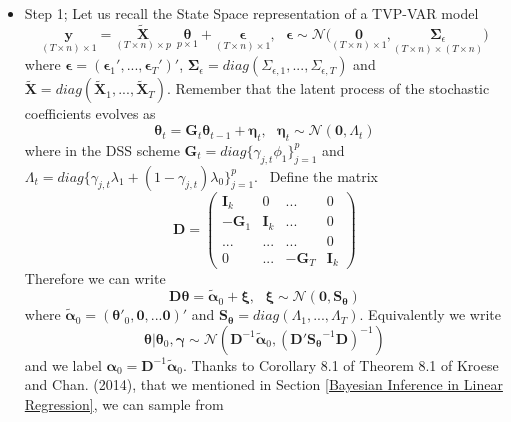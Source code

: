 \documentclass[
  12pt,
]{book}
\theoremstyle{break}
\theoremstyle{nonumberplain}
\begin{document}
\begin{itemize}
\item Step 1; Let us recall the State Space representation of a TVP-VAR model 
\[\underset{(T \times n)\times1}{\boldsymbol{y}}=\underset{(T\times n)\times p}{\tilde{\boldsymbol{X}}}\ \ \underset{p\times 1}{\boldsymbol{\theta}} + \underset{(T \times n)\times1}{\boldsymbol{\epsilon}}, \ \ \ \boldsymbol{\epsilon} \sim \mathcal{N}\bigg(\underset{(T \times n)\times1}{\boldsymbol{0}},\underset{(T \times n)\times (T\times n)}{\boldsymbol{\Sigma}_{\epsilon}}\bigg)\]
where $\boldsymbol{\epsilon} = (\boldsymbol{\epsilon}_{1}',...,\boldsymbol{\epsilon}_{T}')'$, $\boldsymbol{\Sigma}_{\epsilon} = diag(\Sigma_{\epsilon,1},...,\Sigma_{\epsilon,T})$ and $\tilde{\boldsymbol{X}} = diag(\tilde{\boldsymbol{X}}_{1},...,\tilde{\boldsymbol{X}}_{T})$. Remember that the latent process of the stochastic coefficients evolves as 
\[\boldsymbol{\theta}_{t}=\boldsymbol{G}_{t}\boldsymbol{\theta}_{t-1}+\boldsymbol{\eta}_{t}, \ \ \ \boldsymbol{\eta}_{t} \sim \mathcal{N}(\boldsymbol{0},\Lambda_{t})\]
where in the DSS scheme $\boldsymbol{G}_{t}=diag\{\gamma_{j,t}\phi_{1}\}_{j=1}^{p}$ and $\Lambda_{t}=diag\{\gamma_{j,t}\lambda_{1}+(1-\gamma_{j,t})\lambda_{0}\}_{j=1}^{p}$. \
Define the matrix 
\begin{equation} 
\boldsymbol{D} = \begin{pmatrix}
\boldsymbol{I}_{k} & 0 & ... & 0\\
-\boldsymbol{G}_{1} & \boldsymbol{I}_{k} & ... & 0\\
... & ... & ... & 0 \\
0 & ... & -\boldsymbol{G}_{T} & \boldsymbol{I}_{k}
\end{pmatrix}
\end{equation}
Therefore we can write
\[  \boldsymbol{D}\boldsymbol{\theta} = \boldsymbol{\tilde{\alpha}}_{0}+\boldsymbol{\xi}, \ \ \ \boldsymbol{\xi} \sim \mathcal{N}(\boldsymbol{0},\boldsymbol{S_\theta}) \]
where $\boldsymbol{\tilde{\alpha}}_{0}=(\boldsymbol{\theta}'_{0},\boldsymbol{0},...\boldsymbol{0})'$ and $\boldsymbol{S_\theta}=diag(\Lambda_{1},...,\Lambda_{T})$.
Equivalently we write
\[\boldsymbol{\theta} | \boldsymbol{\theta}_{0},\boldsymbol{\gamma} \sim \mathcal{N}(\boldsymbol{D}^{-1}\boldsymbol{\tilde{\alpha}}_{0},(\boldsymbol{D}'\boldsymbol{S_\theta}^{-1}\boldsymbol{D})^{-1})\]
and we label $\boldsymbol{\alpha}_{0}=\boldsymbol{D}^{-1}\boldsymbol{\tilde{\alpha}}_{0}$.
Thanks to Corollary 8.1 of Theorem 8.1 of Kroese and Chan. (2014), that we mentioned in Section \ref{Bayesian Inference in Linear Regression}, we can sample from 

\end{itemize}
\end{document}
